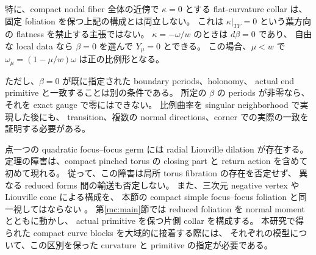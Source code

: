 \begin{remark}[適用範囲と残る接着問題]
特に、compact nodal fiber 全体の近傍で $\kappa=0$ とする
flat-curvature collar は、固定 foliation を保つ上記の構成とは両立しない。
これは $\kappa|_{TF}=0$ という葉方向の flatness を禁止する主張ではない。
$\kappa=-\omega/w$ のときは $d\beta=0$ であり、
自由な local data なら $\beta=0$ を選んで $Y_\mu=0$ とできる。
この場合、$\mu<w$ で $\omega_\mu=(1-\mu/w)\omega$ は正の比例形となる。

ただし、$\beta=0$ が既に指定された boundary periods、holonomy、
actual end primitive と一致することは別の条件である。
所定の $\beta$ の periods が非零なら、それを exact gauge で零にはできない。
比例曲率を singular neighborhood で実現した後にも、
transition、複数の normal directions、corner での実際の一致を証明する必要がある。

点一つの quadratic focus--focus germ には radial Liouville dilation が存在する。
定理の障害は、compact pinched torus の closing part と return action を含めて
初めて現れる。
従って、この障害は局所 torus fibration の存在を否定せず、
異なる reduced forms 間の輸送も否定しない。
また、三次元 negative vertex や Liouville cone による構成を、
本節の compact simple focus--focus foliation と同一視してはならない
\cite{em}。
第\ref{mc:main}節では reduced foliation を normal moment とともに動かし、
actual primitive を保つ片側 collar を構成する。
本研究で得られた compact curve blocks を大域的に接着する際には、
それぞれの模型について、この区別を保った curvature と primitive の指定が必要である。
\end{remark}

